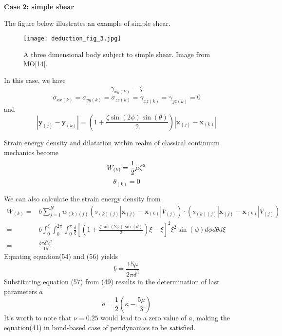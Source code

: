 \documentclass[a4paper,11pt,CJK]{paper}
\newcommand{\bfxj}{\textbf{x}_{(j)}}
\newcommand{\bfyj}{\textbf{y}_{(j)}}
\newcommand{\bfxk}{\textbf{x}_{(k)}}
\newcommand{\bfyk}{\textbf{y}_{(k)}}
\newcommand{\wkj}{w_{(k)(j)}}
\newcommand{\skj}{s_{(k)(j)}}
\newcommand{\thetak}{\theta_{(k)}}
\begin{document}
\textbf{Case 2: simple shear}

The figure below illustrates an example of simple shear.
\begin{figure}[!h]
\center
\texttt{[image: deduction\_fig\_3.jpg]}
\caption{A three dimensional body subject to simple shear. Image from MO[14].}
\end{figure}

In this case, we have
\begin{equation}
\gamma_{xy(k)} = \zeta
\end{equation}
\begin{equation}
\sigma_{xx(k)} = \sigma_{yy(k)} = \sigma_{zz(k)} = \gamma_{xz(k)} =\gamma_{yz(k)} = 0
\end{equation}
and
\begin{equation}
|\bfyj - \bfyk| = (1+\frac{\zeta\sin(2\phi)\sin(\theta)}{2})|\bfxj - \bfxk|
\end{equation}

Strain energy density and dilatation within realm of classical continuum mechanics become
\begin{equation}
W_{(k)} = \frac{1}{2}\mu\zeta^2\\
\end{equation}
\begin{equation}
\thetak = 0
\end{equation}

We can also calculate the strain energy density from 
\begin{equation}
\begin{aligned}
W_{(k)} =& b\sum_{j=1}^{N}\wkj(\skj|\bfxj-\bfxk|V_{(j)})\cdot(\skj|\bfxj-\bfxk|V_{(j)})\\
        =& b\int_0^\delta\int_0^{2\pi}\int_0^{\pi}\frac{\delta}{\xi}\left[(1+\frac{\zeta\sin(2\phi)\sin(\theta)}{2})\xi-\xi\right]^2\xi^2\sin(\phi)d\phi d\theta d\xi\\
        =& \frac{b\pi\delta^5\zeta^2}{15}
\end{aligned}
\end{equation}
Equating equation(54) and (56) yields
\begin{equation}
b = \frac{15\mu}{2\pi\delta^5}
\end{equation}
Substituting equation (57) from (49) results in the determination of last parameters $a$
\begin{equation}
a = \frac{1}{2}(\kappa - \frac{5\mu}{3})
\end{equation}
It's worth to note that $\nu=0.25$ would lead to a zero value of $a$, making the equation(41) in bond-based case of peridynamics to be satisfied.
\end{document}
